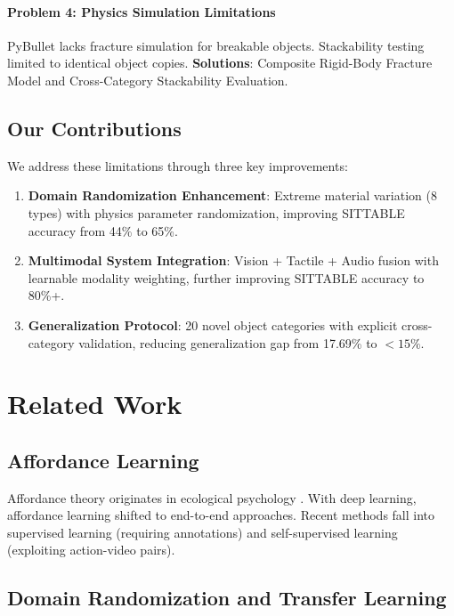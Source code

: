 \documentclass[11pt]{article}
\begin{document}
\paragraph{Problem 4: Physics Simulation Limitations}
PyBullet lacks fracture simulation for breakable objects. Stackability testing limited to identical object copies.
\textbf{Solutions}: Composite Rigid-Body Fracture Model and Cross-Category Stackability Evaluation.

\subsection{Our Contributions}

We address these limitations through three key improvements:

\begin{enumerate}
\item \textbf{Domain Randomization Enhancement}: Extreme material variation (8 types) with physics parameter randomization, improving SITTABLE accuracy from 44\% to 65\%.

\item \textbf{Multimodal System Integration}: Vision + Tactile + Audio fusion with learnable modality weighting, further improving SITTABLE accuracy to 80\%+.

\item \textbf{Generalization Protocol}: 20 novel object categories with explicit cross-category validation, reducing generalization gap from 17.69\% to $<15\%$.
\end{enumerate}

\section{Related Work}

\subsection{Affordance Learning}

Affordance theory originates in ecological psychology \citep{Gibson1977}. With deep learning, affordance learning shifted to end-to-end approaches. Recent methods fall into supervised learning (requiring annotations) and self-supervised learning (exploiting action-video pairs).

\subsection{Domain Randomization and Transfer Learning}
\end{document}
